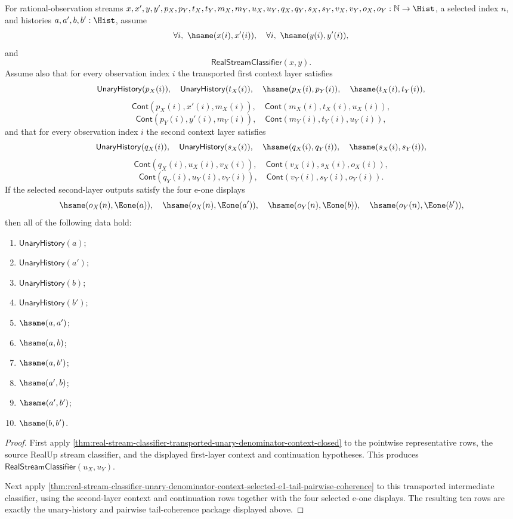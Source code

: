 \begin{theorem}
\label{thm:real-stream-classifier-transported-iterated-unary-context-selected-e1-tail-pairwise-coherence}
For rational-observation streams
$x,x',y,y',p_X,p_Y,t_X,t_Y,m_X,m_Y,u_X,u_Y,q_X,q_Y,s_X,s_Y,v_X,v_Y,o_X,o_Y:
\mathbb{N}\to\Hist$, a selected index $n$, and histories
$a,a',b,b':\Hist$, assume
$$
\forall i,\ \hsame(x(i),x'(i)),\quad
\forall i,\ \hsame(y(i),y'(i)),
$$
and
$$
\mathsf{RealStreamClassifier}(x,y).
$$
Assume also that for every observation index $i$ the transported first context
layer satisfies
$$
\mathsf{UnaryHistory}(p_X(i)),\quad \mathsf{UnaryHistory}(t_X(i)),\quad
\hsame(p_X(i),p_Y(i)),\quad \hsame(t_X(i),t_Y(i)),
$$
$$
\mathsf{Cont}(p_X(i),x'(i),m_X(i)),\quad
\mathsf{Cont}(m_X(i),t_X(i),u_X(i)),
$$
$$
\mathsf{Cont}(p_Y(i),y'(i),m_Y(i)),\quad
\mathsf{Cont}(m_Y(i),t_Y(i),u_Y(i)),
$$
and that for every observation index $i$ the second context layer satisfies
$$
\mathsf{UnaryHistory}(q_X(i)),\quad \mathsf{UnaryHistory}(s_X(i)),\quad
\hsame(q_X(i),q_Y(i)),\quad \hsame(s_X(i),s_Y(i)),
$$
$$
\mathsf{Cont}(q_X(i),u_X(i),v_X(i)),\quad
\mathsf{Cont}(v_X(i),s_X(i),o_X(i)),
$$
$$
\mathsf{Cont}(q_Y(i),u_Y(i),v_Y(i)),\quad
\mathsf{Cont}(v_Y(i),s_Y(i),o_Y(i)).
$$
If the selected second-layer outputs satisfy the four e-one displays
$$
\hsame(o_X(n),\Eone(a)),\quad
\hsame(o_X(n),\Eone(a')),\quad
\hsame(o_Y(n),\Eone(b)),\quad
\hsame(o_Y(n),\Eone(b')),
$$
then all of the following data hold:
\begin{enumerate}
\item $\mathsf{UnaryHistory}(a)$;
\item $\mathsf{UnaryHistory}(a')$;
\item $\mathsf{UnaryHistory}(b)$;
\item $\mathsf{UnaryHistory}(b')$;
\item $\hsame(a,a')$;
\item $\hsame(a,b)$;
\item $\hsame(a,b')$;
\item $\hsame(a',b)$;
\item $\hsame(a',b')$;
\item $\hsame(b,b')$.
\end{enumerate}
\end{theorem}
\begin{proof}
First apply
\autoref{thm:real-stream-classifier-transported-unary-denominator-context-closed}
to the pointwise representative rows, the source RealUp stream classifier, and
the displayed first-layer context and continuation hypotheses. This produces
$\mathsf{RealStreamClassifier}(u_X,u_Y)$.

Next apply
\autoref{thm:real-stream-classifier-unary-denominator-context-selected-e1-tail-pairwise-coherence}
to this transported intermediate classifier, using the second-layer context and
continuation rows together with the four selected e-one displays. The resulting
ten rows are exactly the unary-history and pairwise tail-coherence package
displayed above.
\end{proof}

